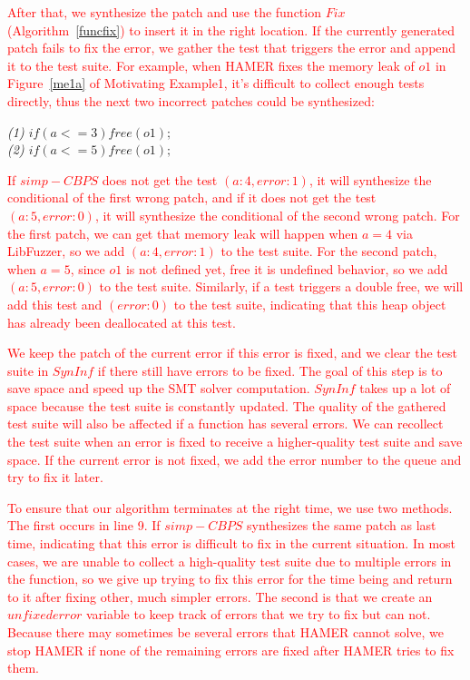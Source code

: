 \documentclass[a4paper,11pt,oneside,openany]{book}
\begin{document}
\textcolor{red}{
After that, we synthesize the patch and use the function $Fix$ (Algorithm~\ref{funcfix}) to insert it in the right location. If the currently generated patch fails to fix the error, we gather the test that triggers the error and append it to the test suite. For example, when HAMER fixes the memory leak of $o1$ in Figure~\ref{me1a} of Motivating Example1, it's difficult to collect enough tests directly, thus the next two incorrect patches could be synthesized:
}

\begin{minipage}{\textwidth}
    \vspace{0.2cm}
    \textsl{\hspace{0.3cm}(1) $if (a<=3)free(o1);$\\\hspace{0.3cm}(2) $if (a<=5)free(o1);$}
\end{minipage}
\textcolor{red}{
If $simp-CBPS$ does not get the test $(a:4, error:1)$, it will synthesize the conditional of the first wrong patch, and if it does not get the test $(a:5, error:0)$, it will synthesize the conditional of the second wrong patch. For the first patch, we can get that memory leak will happen when $a=4$ via LibFuzzer, so we add $(a:4, error:1)$ to the test suite. For the second patch, when $a=5$, since $o1$ is not defined yet, free it is undefined behavior, so we add $(a:5, error:0)$ to the test suite. Similarly, if a test triggers a double free, we will add this test and $(error:0)$ to the test suite, indicating that this heap object has already been deallocated at this test.
}

\textcolor{red}{
We keep the patch of the current error if this error is fixed, and we clear the test suite in $SynInf$ if there still have errors to be fixed. The goal of this step is to save space and speed up the SMT solver computation. $SynInf$ takes up a lot of space because the test suite is constantly updated. The quality of the gathered test suite will also be affected if a function has several errors. We can recollect the test suite when an error is fixed to receive a higher-quality test suite and save space. If the current error is not fixed, we add the error number to the queue and try to fix it later.
}

\textcolor{red}{
To ensure that our algorithm terminates at the right time, we use two methods. The first occurs in line 9. If $simp-CBPS$ synthesizes the same patch as last time, indicating that this error is difficult to fix in the current situation. In most cases, we are unable to collect a high-quality test suite due to multiple errors in the function, so we give up trying to fix this error for the time being and return to it after fixing other, much simpler errors. The second is that we create an $unfixederror$ variable to keep track of errors that we try to fix but can not. Because there may sometimes be several errors that HAMER cannot solve, we stop HAMER if none of the remaining errors are fixed after HAMER tries to fix them.
}
\end{document}
